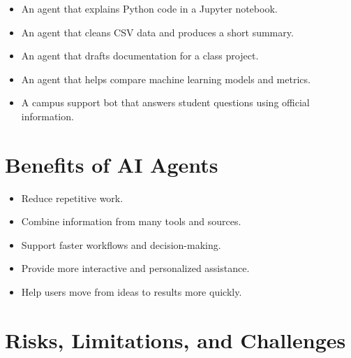 \documentclass[11pt,a4paper]{article}
\begin{document}
\begin{examplebox}
\begin{itemize}[leftmargin=*]
  \item An agent that explains Python code in a Jupyter notebook.
  \item An agent that cleans CSV data and produces a short summary.
  \item An agent that drafts documentation for a class project.
  \item An agent that helps compare machine learning models and metrics.
  \item A campus support bot that answers student questions using official information.
\end{itemize}
\end{examplebox}

\section{Benefits of AI Agents}

\begin{itemize}[leftmargin=*]
  \item Reduce repetitive work.
  \item Combine information from many tools and sources.
  \item Support faster workflows and decision-making.
  \item Provide more interactive and personalized assistance.
  \item Help users move from ideas to results more quickly.
\end{itemize}

\section{Risks, Limitations, and Challenges}
\end{document}
